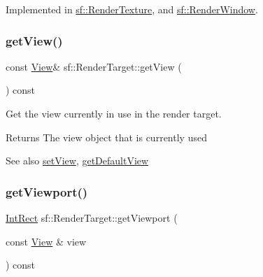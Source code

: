 Implemented in \mbox{\hyperlink{classsf_1_1_render_texture_a6685315b5c4c25a5dcb75b4280b381ba}{sf\+::\+Render\+Texture}}, and \mbox{\hyperlink{classsf_1_1_render_window_ae3eacf93661c8068fca7a78d57dc7e14}{sf\+::\+Render\+Window}}.

\mbox{\label{classsf_1_1_render_target_a2c179503b4dcdf5282ef6426d317602c}} 
\subsubsection{\texorpdfstring{getView()}{getView()}}
{\footnotesize\ttfamily const \mbox{\hyperlink{classsf_1_1_view}{View}}\& sf\+::\+Render\+Target\+::get\+View (\begin{DoxyParamCaption}{ }\end{DoxyParamCaption}) const}



Get the view currently in use in the render target. 

\begin{DoxyReturn}{Returns}
The view object that is currently used
\end{DoxyReturn}
\begin{DoxySeeAlso}{See also}
\mbox{\hyperlink{classsf_1_1_render_target_a063db6dd0a14913504af30e50cb6d946}{set\+View}}, \mbox{\hyperlink{classsf_1_1_render_target_ad3b533c3f899d7044d981ed607aef9be}{get\+Default\+View}} \begin{DoxyVerb}\end{DoxyVerb}
 
\end{DoxySeeAlso}
\mbox{\label{classsf_1_1_render_target_a865d462915dc2a1fae2ebfb3300382ac}} 
\subsubsection{\texorpdfstring{getViewport()}{getViewport()}}
{\footnotesize\ttfamily \mbox{\hyperlink{classsf_1_1_rect}{Int\+Rect}} sf\+::\+Render\+Target\+::get\+Viewport (\begin{DoxyParamCaption}\item[{const \mbox{\hyperlink{classsf_1_1_view}{View}} \&}]{view }\end{DoxyParamCaption}) const}



